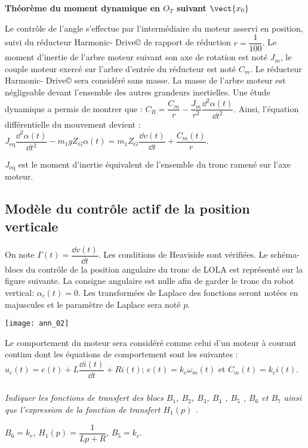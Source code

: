 \begin{multicols}{2}
\begin{corrige}
\textbf{Théorème du moment dynamique en $O_T$ suivant $\vect{x_0}$}



\end{corrige}
\else
\fi

\ifprof
\else
Le contrôle de l'angle s'effectue par l'intermédiaire du moteur asservi en position, suivi du réducteur Harmonic-
Drive© de rapport de réduction $r= \dfrac{1}{100}$. Le moment d'inertie de l'arbre moteur suivant son axe de rotation est
noté $J_m$, le couple moteur exercé sur l'arbre d'entrée du réducteur est noté $C_m$. Le réducteur Harmonic-
Drive© sera considéré sans masse. La masse de l'arbre moteur est négligeable devant l'ensemble des autres
grandeurs inertielles. Une étude dynamique a permis de montrer que : $C_R=\dfrac{C_m}{r}-\dfrac{J_m}{r^2}\dfrac{\dd^2\alpha(t)}{\dd t^2}$. Ainsi, l'équation
différentielle du mouvement devient : 
$J_{\text{eq}} \dfrac{\dd^2\alpha(t)}{\dd t^2} -m_1gZ_G\alpha(t)=m_1 Z_G \dfrac{\dd v(t)}{\dd t}+\dfrac{C_m(t)}{r}$.

$J_{\text{eq}}$ est le moment d'inertie équivalent de l'ensemble du tronc ramené sur l'axe moteur.
\fi


\subsection*{Modèle du contrôle actif de la position verticale}
\ifprof
\else
On note $\Gamma(t)=\dfrac{\dd v(t)}{\dd t }$. Les conditions de Heaviside sont vérifiées. Le schéma-blocs du contrôle de la position angulaire du tronc de LOLA est représenté sur la figure suivante. La consigne angulaire est nulle afin de garder le
tronc du robot vertical: $\alpha_c(t)=0$. Les transformées de Laplace des fonctions seront notées en majuscules et
le paramètre de Laplace sera noté $p$.

\begin{center}
\texttt{[image: ann\_02]}
\end{center}



Le comportement du moteur sera considéré comme celui d'un moteur à courant continu dont les équations de
comportement sont les suivantes : $u_c (t)=e(t)+L \dfrac{\dd i(t)}{\dd t} +Ri (t)$; $e(t)=k_e\omega_m(t)$ et $C_m( t)=k_c i(t)$.

\fi

\subparagraph{} \textit{Indiquer les fonctions de transfert des blocs $B_1$, $B_2$, $B_3$, $B_4$ , $B_5$ , $B_6$ et $B_7$ ainsi que l'expression de la fonction de transfert $H_1(p)$ .}
\ifprof
\begin{corrige}
$B_6 = k_e$, $H_1(p)=\dfrac{1}{Lp + R}$, $B_5 = k_c$. 


\end{corrige}
\end{multicols}
